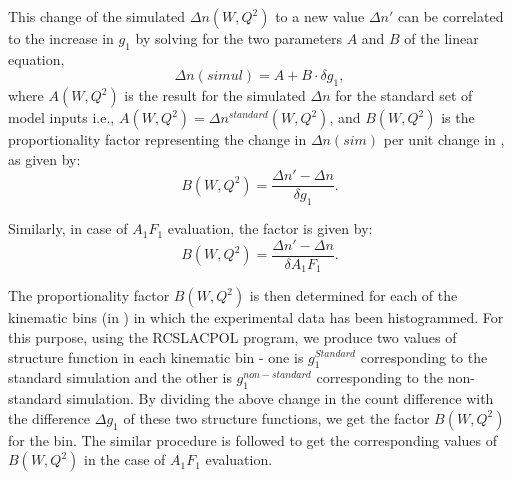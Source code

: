 This change of the simulated $\Delta n (W,Q^2)$ to a new value $\Delta n'$ can be correlated to the increase in $g_1$ by solving for the two parameters $A$ and $B$ of the linear equation,
\begin{equation}
\Delta n(simul) = A + B\cdot \delta g_1,
\end{equation} %
where $A(W,Q^2) $ is the result for the simulated $\Delta n$ for the standard set of model inputs i.e., $A(W,Q^2)= \Delta n^{standard}(W,Q^2)$, and $B(W,Q^2) $ is the proportionality factor representing the change in $\Delta n(sim)$ per unit change in \gone, as given by:
\begin{equation}
\label{propFac}
B(W,Q^2)  = \frac{\Delta n' - \Delta n}{\delta g_1}.
\end{equation}

Similarly, in case of $A_1F_1$ evaluation, the factor is given by:
\begin{equation}
\label{propFacA1F1}
B(W,Q^2)  = \frac{\Delta n' - \Delta n}{\delta A_1F_1}.
\end{equation}


The proportionality factor  $B(W,Q^2)$ is then determined for each of the kinematic bins (in \wq) in which the experimental data has been histogrammed. For this purpose, using the RCSLACPOL program, we produce two values of structure function \gones in each kinematic bin - one is $g_1^{Standard}$ corresponding to the standard simulation and the other is $g_1^{non-standard}$ corresponding to the non-standard simulation. By dividing the above change in the count difference with the difference $\Delta g_1$ of these two structure functions, we get the factor $B(W,Q^2)$ for the bin. The similar procedure is followed to get the corresponding values of $B(W,Q^2)$ in the case of $A_1F_1$ evaluation.



